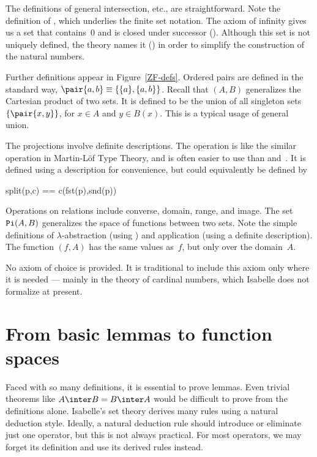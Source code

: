 The definitions of general intersection, etc., are straightforward.  Note
the definition of , which underlies the finite set notation.
The axiom of infinity gives us a set that contains~0 and is closed under
successor ().  Although this set is not uniquely defined,
the theory names it () in order to simplify the
construction of the natural numbers.
					     
Further definitions appear in Figure~\ref{ZF-defs}.  Ordered pairs are
defined in the standard way, $\pair{a,b}\equiv\{\{a\},\{a,b\}\}$.  Recall
that $(A,B)$ generalizes the Cartesian product of two
sets.  It is defined to be the union of all singleton sets
$\{\pair{x,y}\}$, for $x\in A$ and $y\in B(x)$.  This is a typical usage of
general union.

The projections involve definite descriptions.  The 
operation is like the similar operation in Martin-L\"of Type Theory, and is
often easier to use than  and~.  It is defined
using a description for convenience, but could equivalently be defined by
\begin{ttbox}
split(p,c) == c(fst(p),snd(p))
\end{ttbox}  
Operations on relations include converse, domain, range, and image.  The
set ${\tt Pi}(A,B)$ generalizes the space of functions between two sets.
Note the simple definitions of $\lambda$-abstraction (using
) and application (using a definite description).  The
function $(f,A)$ has the same values as~$f$, but only
over the domain~$A$.

No axiom of choice is provided.  It is traditional to include this axiom
only where it is needed --- mainly in the theory of cardinal numbers, which
Isabelle does not formalize at present.


\section{From basic lemmas to function spaces}
Faced with so many definitions, it is essential to prove lemmas.  Even
trivial theorems like $A\inter B=B\inter A$ would be difficult to prove
from the definitions alone.  Isabelle's set theory derives many rules using
a natural deduction style.  Ideally, a natural deduction rule should
introduce or eliminate just one operator, but this is not always practical.
For most operators, we may forget its definition and use its derived rules
instead.

